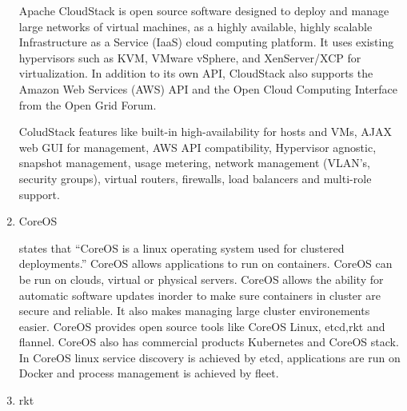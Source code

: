 \begin{enumerate}
Apache CloudStack is open source software designed to deploy and
manage large networks of virtual machines, as a highly available,
highly scalable Infrastructure as a Service (IaaS) cloud
computing platform. It uses existing hypervisors such as KVM,
VMware vSphere, and XenServer/XCP for virtualization. In addition
to its own API, CloudStack also supports the Amazon Web Services
(AWS) API and the Open Cloud Computing Interface from the Open
Grid Forum. \label{\detokenize{i524/technologies:id645}}{\hyperref[\detokenize{i524/technologies:www-cloudstack}]{\sphinxcrossref{{[}558{]}}}}

ColudStack features like built-in high-availability for hosts
and VMs, AJAX web GUI for management, AWS API compatibility,
Hypervisor agnostic, snapshot management, usage metering, network
management (VLAN's, security groups), virtual routers, firewalls,
load balancers and multi-role support. \label{\detokenize{i524/technologies:id646}}{\hyperref[\detokenize{i524/technologies:www-cloudstack-wikipedia}]{\sphinxcrossref{{[}559{]}}}}

\item {} 
CoreOS

\label{\detokenize{i524/technologies:id647}}{\hyperref[\detokenize{i524/technologies:www-core}]{\sphinxcrossref{{[}560{]}}}} states that “CoreOS is a linux operating system
used for clustered deployments.” CoreOS allows applications to
run on containers. CoreOS can be run on clouds, virtual or
physical servers. CoreOS allows the ability for automatic software
updates inorder to make sure containers in cluster are secure and
reliable. It also makes managing large cluster environements
easier. CoreOS provides open source tools like CoreOS Linux,
etcd,rkt and flannel. CoreOS also has commercial products
Kubernetes and CoreOS stack. In CoreOS linux service
discovery is achieved by etcd, applications are run on Docker and
process management is achieved by fleet.

\item {} 
rkt


\end{enumerate}
